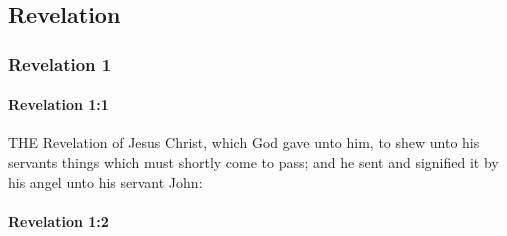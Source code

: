 \subsection{Revelation}
	\label{REVELATIONNT}
	
	\subsubsection{Revelation 1} %
		\label{REVELATIONNT-1}
		
		\paragraph{Revelation 1:1} %
			\label{REVELATIONNT-1-1}

			THE Revelation of Jesus Christ, which God gave unto him, to shew unto his servants things which must shortly come to pass; and he sent and signified it by his angel unto his servant John:

			\begin{framed}
			\scriptsize
				\begin{compactdesc}
					\item[SBLG] 
				\end{compactdesc}
			\end{framed}

		\paragraph{Revelation 1:2} %
			\label{REVELATIONNT-1-2}

